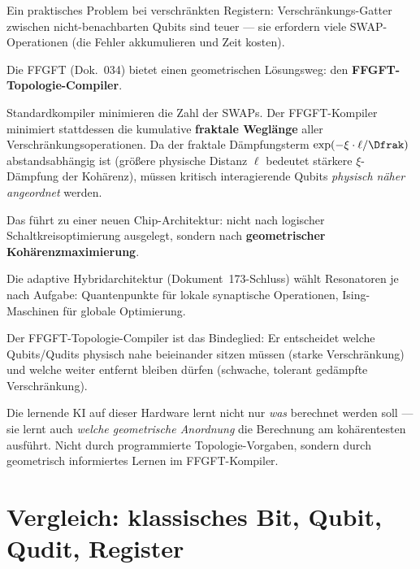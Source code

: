 Ein praktisches Problem bei verschränkten Registern:
Verschränkungs-Gatter zwischen nicht-benachbarten Qubits
sind teuer --- sie erfordern viele SWAP-Operationen
(die Fehler akkumulieren und Zeit kosten).

Die FFGFT (Dok.~034) bietet einen geometrischen
Lösungsweg: den \textbf{FFGFT-Topologie-Compiler}.

Standardkompiler minimieren die Zahl der SWAPs.
Der FFGFT-Kompiler minimiert stattdessen die kumulative
\textbf{fraktale Weglänge} aller Verschränkungsoperationen.
Da der fraktale Dämpfungsterm $\exp(-\xi \cdot \ell / \Dfrak)$
abstandsabhängig ist (größere physische Distanz $\ell$
bedeutet stärkere $\xi$-Dämpfung der Kohärenz),
müssen kritisch interagierende Qubits
\emph{physisch näher angeordnet} werden.

Das führt zu einer neuen Chip-Architektur:
nicht nach logischer Schaltkreisoptimierung ausgelegt,
sondern nach \textbf{geometrischer Kohärenzmaximierung}.

\begin{significance}
Die adaptive Hybridarchitektur (Dokument~173-Schluss)
wählt Resonatoren je nach Aufgabe:
Quantenpunkte für lokale synaptische Operationen,
Ising-Maschinen für globale Optimierung.

Der FFGFT-Topologie-Compiler ist das Bindeglied:
Er entscheidet welche Qubits/Qudits physisch
nahe beieinander sitzen müssen (starke Verschränkung)
und welche weiter entfernt bleiben dürfen
(schwache, tolerant gedämpfte Verschränkung).

Die lernende KI auf dieser Hardware lernt nicht nur
\emph{was} berechnet werden soll ---
sie lernt auch \emph{welche geometrische Anordnung}
die Berechnung am kohärentesten ausführt.
Nicht durch programmierte Topologie-Vorgaben,
sondern durch geometrisch informiertes Lernen
im FFGFT-Kompiler.
\end{significance}

\section{Vergleich: klassisches Bit, Qubit, Qudit, Register}
\label{sec:vergleich}

